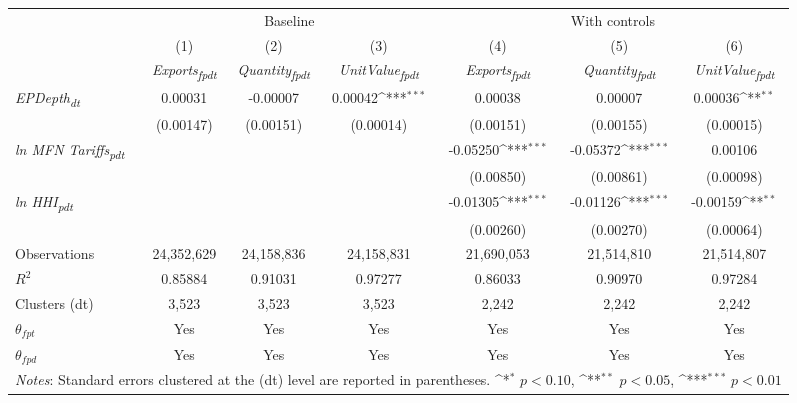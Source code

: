 {
\def\sym#1{\ifmmode^{#1}\else\(^{#1}\)\fi}
\begin{tabular}{l*{6}{c}}
\toprule
&\multicolumn{3}{c}{Baseline}&\multicolumn{3}{c}{With controls}\\\cmidrule(lr){2-4}\cmidrule(lr){5-7}
&(1)&(2)&(3)&(4)&(5)&(6)\\
&\textit{Exports\textsubscript{fpdt}}&\textit{Quantity\textsubscript{fpdt}}&\textit{UnitValue\textsubscript{fpdt}}&\textit{Exports\textsubscript{fpdt}}&\textit{Quantity\textsubscript{fpdt}}&\textit{UnitValue\textsubscript{fpdt}}\\
\midrule
\textit{EPDepth\textsubscript{dt}} & 0.00031 & -0.00007 & 0.00042\sym{***} & 0.00038 & 0.00007 & 0.00036\sym{**}\\
 & (0.00147) & (0.00151) & (0.00014) & (0.00151) & (0.00155) & (0.00015)\\
\addlinespace
\textit{ln MFN Tariffs\textsubscript{pdt}} &  &  &  & -0.05250\sym{***} & -0.05372\sym{***} & 0.00106\\
 &  &  &  & (0.00850) & (0.00861) & (0.00098)\\
\addlinespace
\textit{ln HHI\textsubscript{pdt}} &  &  &  & -0.01305\sym{***} & -0.01126\sym{***} & -0.00159\sym{**}\\
 &  &  &  & (0.00260) & (0.00270) & (0.00064)\\
\midrule
Observations & 24,352,629 & 24,158,836 & 24,158,831 & 21,690,053 & 21,514,810 & 21,514,807\\
$R^{2}$ & 0.85884 & 0.91031 & 0.97277 & 0.86033 & 0.90970 & 0.97284\\
Clusters (dt) & 3,523 & 3,523 & 3,523 & 2,242 & 2,242 & 2,242\\
$\theta_{fpt}$ & Yes & Yes & Yes & Yes & Yes & Yes\\
$\theta_{fpd}$ & Yes & Yes & Yes & Yes & Yes & Yes\\
\bottomrule
\multicolumn{7}{l}{\footnotesize \textit{Notes}: Standard errors clustered at the (dt) level are reported in parentheses. \sym{*} \(p<0.10\), \sym{**} \(p<0.05\), \sym{***} \(p<0.01\)}\\
\end{tabular}
}
